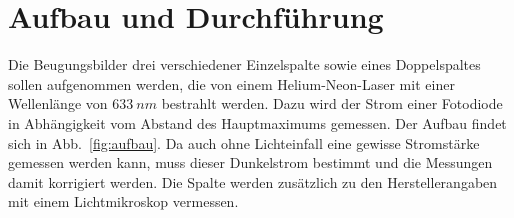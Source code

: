 \section {Aufbau und Durchführung}
\label{sec:durchführung}

Die Beugungsbilder drei verschiedener Einzelspalte sowie eines Doppelspaltes sollen aufgenommen werden, die von einem Helium-Neon-Laser mit einer Wellenlänge von $\SI{633}{nm}$ bestrahlt werden. Dazu wird der Strom einer Fotodiode in Abhängigkeit vom Abstand des Hauptmaximums gemessen. Der Aufbau findet sich in Abb.~\ref{fig:aufbau}.
Da auch ohne Lichteinfall eine gewisse Stromstärke gemessen werden kann, muss dieser Dunkelstrom bestimmt und die Messungen damit korrigiert werden. Die Spalte werden zusätzlich zu den Herstellerangaben mit einem Lichtmikroskop vermessen.
